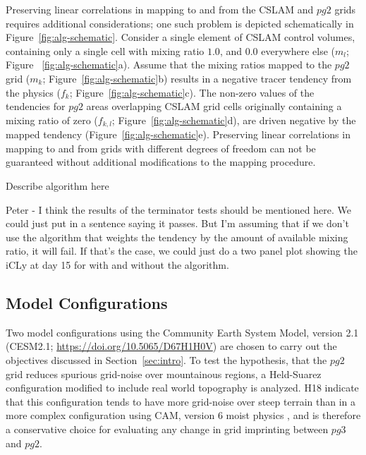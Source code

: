 \documentclass{agujournal}
\begin{document}

Preserving linear correlations in mapping to and from the CSLAM and $pg2$ grids requires additional considerations; one such problem is depicted schematically in Figure~\ref{fig:alg-schematic}. Consider a single element of CSLAM control volumes, containing only a single cell with mixing ratio $1.0$, and $0.0$ everywhere else ($m_l$; Figure ~\ref{fig:alg-schematic}a). Assume that the mixing ratios mapped to the $pg2$ grid ($m_k$; Figure~\ref{fig:alg-schematic}b) results in a negative tracer tendency from the physics ($f_k$; Figure~\ref{fig:alg-schematic}c). The non-zero values of the tendencies for $pg2$ areas overlapping CSLAM grid cells originally containing a mixing ratio of zero ($f_{k,l}$; Figure~\ref{fig:alg-schematic}d), are driven negative by the mapped tendency (Figure~\ref{fig:alg-schematic}e). Preserving linear correlations in mapping to and from grids with different degrees of freedom can not be guaranteed without additional modifications to the mapping procedure.

{\color{red}Describe algorithm here}

{\color{red}Peter -  I think the results of the terminator tests should be mentioned here. We could just put in a sentence saying it passes. But I'm assuming that if we don't use the algorithm that weights the tendency by the amount of available mixing ratio, it will fail. If that's the case, we could just do a two panel plot showing the iCLy at day 15 for with and without the algorithm.}

\subsection{Model Configurations}\label{sec:config}

Two model configurations using the Community Earth System Model, version 2.1 (CESM2.1; \url{https://doi.org/10.5065/D67H1H0V}) are chosen to carry out the objectives discussed in Section~\ref{sec:intro}. To test the hypothesis, that the $pg2$ grid reduces spurious grid-noise over mountainous regions, a Held-Suarez configuration \citep[$FHS94$ compset;][]{HS1994} modified to include real world topography is analyzed. H18 indicate that this configuration tends to have more grid-noise over steep terrain than in a more complex configuration using CAM, version 6 moist physics \citep[CAM6;][]{}, and is therefore a conservative choice for evaluating any change in grid imprinting between $pg3$ and $pg2$. 
\end{document}
